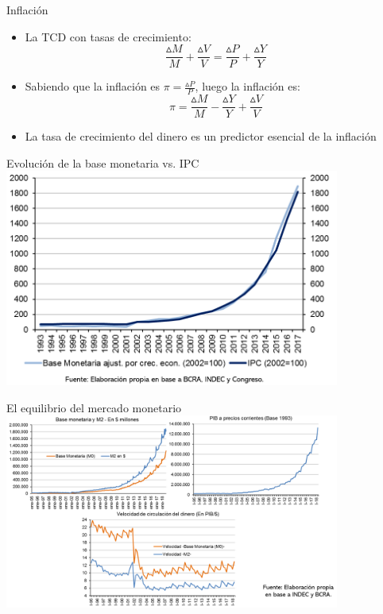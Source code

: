 \documentclass{beamer}
\begin{document}
\begin{frame}{Inflación}
    \begin{itemize}
    \item La TCD con tasas de crecimiento: \\
$$\frac{\vartriangle M}{M} + \frac{\vartriangle V}{V} = \frac{\vartriangle P}{P} + \frac{\vartriangle Y}{Y}$$ \vspace{1mm}
    \item Sabiendo que la inflación es $\pi = \frac{\vartriangle P}{P}$, luego la inflación es: \\
    $$\pi = \frac{\vartriangle M}{M} - \frac{\vartriangle Y}{Y} + \frac{\vartriangle V}{V}$$ \vspace{1mm}
    \item La tasa de crecimiento del dinero es un predictor esencial de la inflación
    \end{itemize}
\end{frame}

\begin{frame}{Evolución de la base monetaria vs. IPC}
\centering\includegraphics[width=11cm]{Figures/P55.png}\
\end{frame}

\begin{frame}{El equilibrio del mercado monetario}
\centering\includegraphics[width=11cm]{Figures/P56.png}\
\end{frame}
\end{document}

